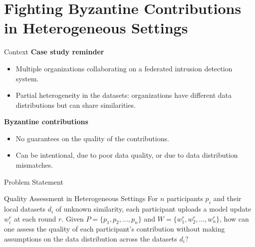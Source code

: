 \section{Fighting Byzantine Contributions in Heterogeneous Settings}

\begin{frame}
  \sectionpage

\end{frame}


\begin{frame}{Context}
  \textbf{Case study reminder}
  \begin{itemize}
    \item Multiple organizations collaborating on a federated intrusion detection system.
    \item Partial heterogeneity in the datasets: organizations have different data distributions but can share similarities.
  \end{itemize}

  \textbf{Byzantine contributions}
  \begin{itemize}
    \item No guarantees on the quality of the contributions.
    \item Can be intentional, due to poor data quality, or due to data distribution mismatches.
  \end{itemize}

\end{frame}

\begin{frame}{Problem Statement}
  \begin{block}{Quality Assessment in Heterogeneous Settings}
    For $n$ participants $p_i$ and their local datasets $d_i$ of unknown similarity, each participant uploads a model update $w_i^r$ at each round $r$. Given $P = \{ p_1, p_2, \dots, p_n \} $ and $W = \{ w_1^r, w_2^r, \dots, w_n^r \} $, how can one assess the quality of each participant’s contribution without making assumptions on the data distribution across the datasets $d_i$?
  \end{block}
\end{frame}

